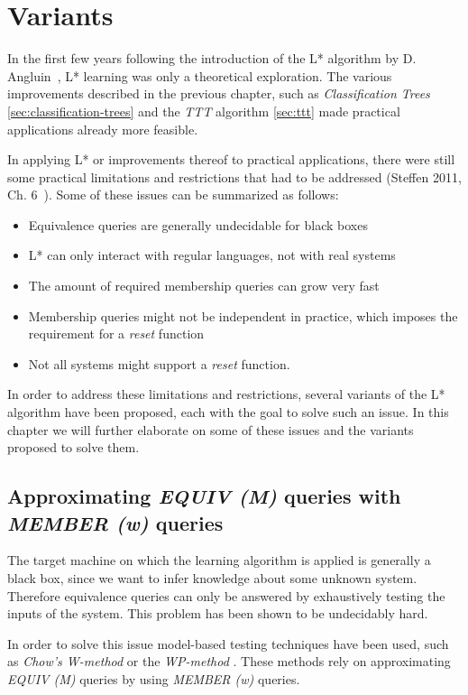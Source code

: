 \documentclass[multi,crop=false,class=article]{standalone}
\begin{document}
\section{Variants}
\label{sec:variants}
In the first few years following the introduction of the L* algorithm by
D. Angluin~\cite{Angluin87}, L* learning was only a theoretical exploration.
The various improvements described in the previous chapter,
such as \textit{Classification Trees} \cref{sec:classification-trees} and
the \textit{TTT} algorithm \cref{sec:ttt}
made practical applications already more feasible.

In applying L* or improvements thereof to practical applications,
there were still some practical limitations and restrictions that had to
be addressed (Steffen 2011, Ch. 6~\cite{Steffen11}).
Some of these issues can be summarized as follows:
\begin{itemize}
  \item Equivalence queries are generally undecidable for black boxes
  \item L* can only interact with regular languages, not with real systems
  \item The amount of required membership queries can grow very fast
  \item Membership queries might not be independent in practice,
        which imposes the requirement for a \textit{reset} function
  \item Not all systems might support a \textit{reset} function.
\end{itemize}

In order to address these limitations and restrictions,
several variants of the L* algorithm have been proposed,
each with the goal to solve such an issue.
In this chapter we will further elaborate on some of these issues
and the variants proposed to solve them.

\subsection{Approximating \textit{EQUIV (M)} queries with \textit{MEMBER (w)} queries}
The target machine on which the learning algorithm is applied is generally
a black box, since we want to infer knowledge about some unknown system.
Therefore equivalence queries can only be answered by exhaustively testing
the inputs of the system. This problem has been shown to be undecidably hard.

In order to solve this issue model-based testing techniques have been used,
such as \textit{Chow's W-method} or the \textit{WP-method} .
These methods rely on approximating \textit{EQUIV (M)} queries by using
\textit{MEMBER (w)} queries.
\end{document}
